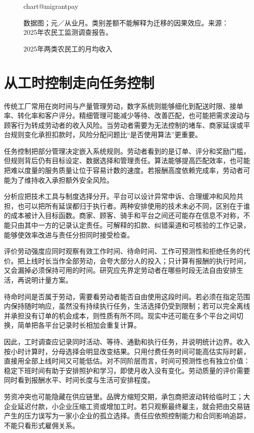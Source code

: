 \documentclass[UTF8,fontset=fandol,zihao=-4,oneside,openany]{ctexbook}
\makeatletter
\newcommand{\Chart}[3]{\begin{figure}[htbp]\centering\csname chart@#1\endcsname\caption{#2}\par\small #3\end{figure}}
\makeatother
\begin{document}
\Chart{migrantpay}{2025年两类农民工的月均收入}{数据图；元／从业月。类别差额不能解释为迁移的因果效应。来源：2025年农民工监测调查报告。\cite{Migrant2025}}

\section{从工时控制走向任务控制}
传统工厂常用在岗时间与产量管理劳动，数字系统则能够细化到配送时限、接单率、转化率和客户评分。精细管理可能减少等待、改善匹配，也可能把需求波动与顾客行为转成劳动者的收入风险。当劳动者需要为无法控制的堵车、商家延误或平台规则变化承担扣款时，风险分配问题比“是否使用算法”更重要。

\label{arg:P066}
任务控制把部分管理决定嵌入系统规则。劳动者看到的是订单、评分和奖励门槛，但规则背后仍有目标设定、数据选择和管理责任。算法能够提高匹配效率，也可能把难以度量的服务质量让位于容易计数的速度。若报酬高度依赖完成率，劳动者可能为了维持收入承担额外安全风险。

分析应把技术工具与制度选择分开。平台可以设计异常申诉、合理缓冲和风险共担，也可以把所有延误都归于执行者。两种安排使用的技术未必不同，区别在于谁的成本被计入目标函数。商家、顾客、骑手和平台之间还可能存在信息不对称，不能只由其中一方的记录认定责任。可解释的扣款、纠错渠道和可核验的工作记录，能够使效率改进与责任分担同时接受检查。

评价劳动强度应同时观察有效工作时间、待命时间、工作可预测性和拒绝任务的代价。把上线时长当作全部劳动，会夸大部分人的投入；只计算有报酬的执行时间，又会漏掉必须保持可用的时间。研究应先界定劳动者在哪些时段无法自由安排生活，再说明计量方案。

\label{arg:P067}
待命时间是否属于劳动，需要看劳动者能否自由使用这段时间。若必须在指定范围内保持随时响应，虽然没有持续执行任务，生活选择仍受到限制；若可以完全离线并承担没有订单的机会成本，则性质有所不同。现实中还可能在多个平台之间切换，简单把各平台记录时长相加会重复计算。

因此，工时调查应记录同时活动、等待、通勤和执行任务，并说明统计边界。收入按小时计算时，分母选择会明显改变结果。只用付费任务时间可能高估实际时薪，直接用全部上线时间又可能低估。对不同阶层而言，时间可预测性也有独立价值：稳定下班时间有助于安排照护和学习，即使月收入没有变化。劳动质量的评价需要同时看到报酬水平、时间长度与生活可安排程度。

劳资冲突也可能隐藏在供应链里。品牌方缩短交期，承包商把波动转给临时工；大企业延迟付款，小企业压缩工资或增加工时。若只观察最终雇主，就会把由交易链产生的压力误写为一家小企业的孤立选择。责任应依照控制能力和合同影响追踪，不能只看形式雇佣关系。
\end{document}

